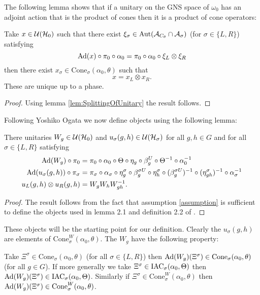 \documentclass[11pt,a4paper,twoside]{article}
\numberwithin{equation}{section}
\begin{document}
The following lemma shows that if a unitary on the GNS space of $\omega_0$ has an adjoint action that is the product of cones then it is a product of cone operators:
\begin{lemma}\label{lem:UsingIrreducibilityAndWignerTheorem}
	Take $x\in\mathcal U(\mathcal H_0)$ such that there exist $\xi_\sigma\in\Aut{\AA_{C_\theta}\cap\AA_\sigma}$ (for $\sigma\in\{L,R\}$) satisfying
	\begin{equation}
		\Ad{x}\circ\pi_0\circ\alpha_0=\pi_0\circ\alpha_0\circ\xi_L\otimes\xi_R
	\end{equation}
	then there exist $x_\sigma\in\textrm{Cone}_\sigma(\alpha_0,\theta)$ such that
	\begin{equation}
		x=x_L\otimes x_R.
	\end{equation}
	These are unique up to a phase.
\end{lemma}
\begin{proof}
Using lemma \ref{lem:SplittingOfUnitary} the result follows.
\end{proof}
Following Yoshiko Ogata \cite{ogata2021h3gmathbb} we now define objects using the following lemma:
\begin{lemma}\label{lem:Definition_W_And_u}
	There unitaries $W_g\in\mathcal U(\mathcal H_0)$ and $u_{\sigma}(g,h)\in\mathcal U(\mathcal H_{\sigma})$ for all $g,h\in G$ and for all $\sigma\in\{L,R\}$ satisfying
	\begin{align}
		\Ad{W_g}\circ\pi_0&=\pi_0\circ\alpha_0\circ\Theta\circ\eta_g\circ\beta_g^U\circ\Theta^{-1}\circ\alpha_0^{-1}\\
		\Ad{u_\sigma(g,h)}\circ\pi_\sigma&=\pi_\sigma\circ\alpha_\sigma\circ\eta_g^\sigma\circ\beta_g^{\sigma U}\circ\eta_h^{\sigma}\circ(\beta_g^{\sigma U})^{-1}\circ(\eta^\sigma_{gh})^{-1}\circ\alpha_\sigma^{-1}\\
		u_L(g,h)\otimes u_R(g,h)&=W_gW_hW_{gh}^{-1}.
	\end{align}
\end{lemma}
\begin{proof}
	The result follows from the fact that assumption \ref{assumption} is sufficient to define the objects used in lemma 2.1 and definition 2.2 of \cite{ogata2021h3gmathbb}.
\end{proof}
These objects will be the starting point for our definition. Clearly the $u_\sigma(g,h)$ are elements of $\textrm{Cone}_\sigma^W(\alpha_0,\theta)$. The $W_g$ have the following property:
\begin{lemma}\label{lem:AdjointOverConeIsInCone}
	Take $\Xi^{\sigma}\in\textrm{Cone}_\sigma(\alpha_0,\theta)$ (for all $\sigma\in\{L,R\}$) then $\Ad{W_g}(\Xi^\sigma)\in\textrm{Cone}_\sigma(\alpha_0,\theta)$ (for all $g\in G$).	If more generally we take $\Xi^\sigma\in\textrm{IAC}_\sigma(\alpha_0,\Theta)$ then $\Ad{W_g}(\Xi^\sigma)\in\IAC_\sigma(\alpha_0,\Theta)$. Similarly if $\Xi^{\sigma}\in\textrm{Cone}_\sigma^W(\alpha_0,\theta)$ then $\Ad{W_g}(\Xi^\sigma)\in\textrm{Cone}_\sigma^W(\alpha_0,\theta)$.
\end{lemma}
\end{document}
